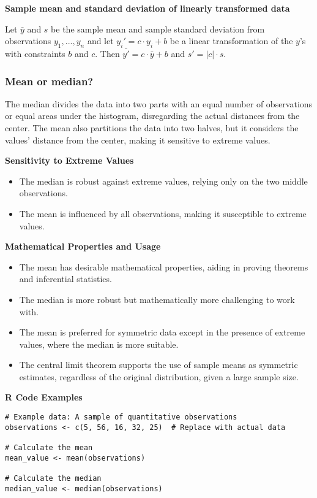 \documentclass{article}
\begin{document}
\textbf{Sample mean and standard deviation of linearly transformed data}

Let $\bar{y}$ and $s$ be the sample mean and sample standard deviation from observations $y_1,...,y_n$ and let $y_{i}'=c \cdot y_{i} + b$ be a linear transformation of the $y$'s with constraints $b$ and $c$. Then $\bar{y'} = c \cdot \bar{y}+b$ and $s'=|c|\cdot s$.

\subsubsection{Mean or median?}
The median divides the data into two parts with an equal number of observations or equal areas under the histogram, disregarding the actual distances from the center. The mean also partitions the data into two halves, but it considers the values' distance from the center, making it sensitive to extreme values. 

\textbf{Sensitivity to Extreme Values}
\begin{itemize}
    \item The median is robust against extreme values, relying only on the two middle observations.
    \item The mean is influenced by all observations, making it susceptible to extreme values.
\end{itemize} 

\textbf{Mathematical Properties and Usage}
\begin{itemize}
    \item The mean has desirable mathematical properties, aiding in proving theorems and inferential statistics.
    \item The median is more robust but mathematically more challenging to work with.
    \item The mean is preferred for symmetric data except in the presence of extreme values, where the median is more suitable.
    \item The central limit theorem supports the use of sample means as symmetric estimates, regardless of the original distribution, given a large sample size.
\end{itemize}

\textbf{R Code Examples}
\begin{lstlisting}
# Example data: A sample of quantitative observations
observations <- c(5, 56, 16, 32, 25)  # Replace with actual data

# Calculate the mean
mean_value <- mean(observations)

# Calculate the median
median_value <- median(observations)
\end{lstlisting}
\end{document}
